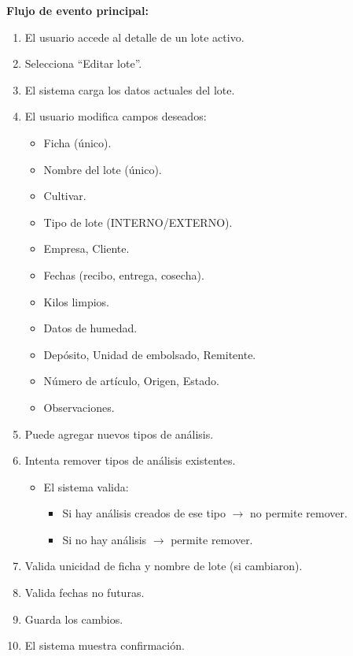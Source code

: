 \vspace{0.5em}
\noindent\textbf{Flujo de evento principal:}
\begin{enumerate}[nosep]
    \item El usuario accede al detalle de un lote activo.
    \item Selecciona ``Editar lote''.
    \item El sistema carga los datos actuales del lote.
    \item El usuario modifica campos deseados:
    \begin{itemize}[nosep]
        \item Ficha (único).
        \item Nombre del lote (único).
        \item Cultivar.
        \item Tipo de lote (INTERNO/EXTERNO).
        \item Empresa, Cliente.
        \item Fechas (recibo, entrega, cosecha).
        \item Kilos limpios.
        \item Datos de humedad.
        \item Depósito, Unidad de embolsado, Remitente.
        \item Número de artículo, Origen, Estado.
        \item Observaciones.
    \end{itemize}
    \item Puede agregar nuevos tipos de análisis.
    \item Intenta remover tipos de análisis existentes.
    \begin{itemize}[nosep]
        \item El sistema valida:
        \begin{itemize}[nosep]
            \item Si hay análisis creados de ese tipo $\rightarrow$ no permite remover.
            \item Si no hay análisis $\rightarrow$ permite remover.
        \end{itemize}
    \end{itemize}
    \item Valida unicidad de ficha y nombre de lote (si cambiaron).
    \item Valida fechas no futuras.
    \item Guarda los cambios.
    \item El sistema muestra confirmación.
\end{enumerate}

